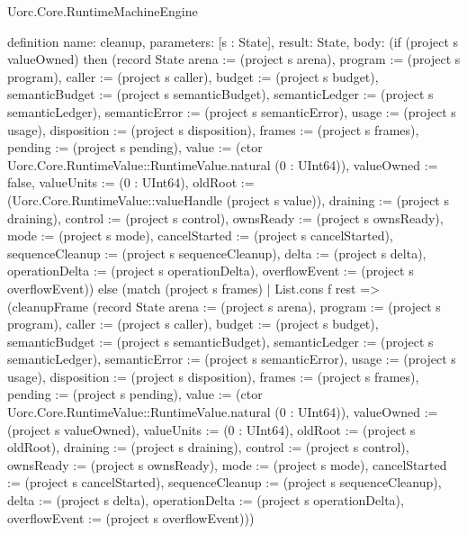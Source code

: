 \begin{lexlean}{Uorc.Core.RuntimeMachineEngine}
\begin{semanticmodule}
definition{
  name: cleanup,
  parameters: [s : State],
  result: State,
  body: (if (project s valueOwned) then (record State {arena := (project s arena), program := (project s program), caller := (project s caller), budget := (project s budget), semanticBudget := (project s semanticBudget), semanticLedger := (project s semanticLedger), semanticError := (project s semanticError), usage := (project s usage), disposition := (project s disposition), frames := (project s frames), pending := (project s pending), value := (ctor Uorc.Core.RuntimeValue::RuntimeValue.natural (0 : UInt64)), valueOwned := false, valueUnits := (0 : UInt64), oldRoot := (Uorc.Core.RuntimeValue::valueHandle (project s value)), draining := (project s draining), control := (project s control), ownsReady := (project s ownsReady), mode := (project s mode), cancelStarted := (project s cancelStarted), sequenceCleanup := (project s sequenceCleanup), delta := (project s delta), operationDelta := (project s operationDelta), overflowEvent := (project s overflowEvent)}) else (match (project s frames)
    | List.cons f rest => (cleanupFrame (record State {arena := (project s arena), program := (project s program), caller := (project s caller), budget := (project s budget), semanticBudget := (project s semanticBudget), semanticLedger := (project s semanticLedger), semanticError := (project s semanticError), usage := (project s usage), disposition := (project s disposition), frames := (project s frames), pending := (project s pending), value := (ctor Uorc.Core.RuntimeValue::RuntimeValue.natural (0 : UInt64)), valueOwned := (project s valueOwned), valueUnits := (0 : UInt64), oldRoot := (project s oldRoot), draining := (project s draining), control := (project s control), ownsReady := (project s ownsReady), mode := (project s mode), cancelStarted := (project s cancelStarted), sequenceCleanup := (project s sequenceCleanup), delta := (project s delta), operationDelta := (project s operationDelta), overflowEvent := (project s overflowEvent)}))
}
\end{semanticmodule}
\end{lexlean}
